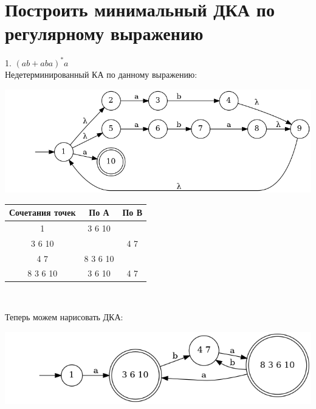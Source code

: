 \documentclass{article}
\begin{document}
\section{Построить минимальный ДКА по регулярному выражению}
    1. $(ab+aba)^*a$\\
    Недетерминированный КА по данному выражению:
    \begin{center}
        \includegraphics[width=1\textwidth]{pic3_1_1.dot}\\
    \end{center}
    \begin{center}
        \begin{tabular}{|c|c|c|}
            \hline
            Сочетания точек & По А & По В \\
            \hline
            1 & 3 6 10 & \\
            3 6 10 & & 4 7 \\
            4 7 & 8 3 6 10 & \\
            8 3 6 10 & 3 6 10 & 4 7\\
            \hline
        \end{tabular}\\
    \end{center}
    Теперь можем нарисовать ДКА:
    \begin{center}
        \includegraphics[width=1\textwidth]{pic3_1_2.dot}\\
    \end{center}
\end{document}
